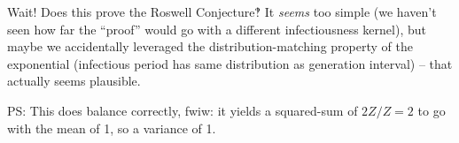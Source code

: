 \documentclass[12pt]{article}
\begin{document}
Wait! Does this prove the Roswell Conjecture‽ It \emph{seems} too simple (we haven't seen how far the “proof” would go with a different infectiousness kernel), but maybe we accidentally leveraged the distribution-matching property of the exponential (infectious period has same distribution as generation interval) – that actually seems plausible.

PS: This does balance correctly, fwiw: it yields a squared-sum of $2Z/Z = 2$ to go with the mean of 1, so a variance of 1.
\end{document}
